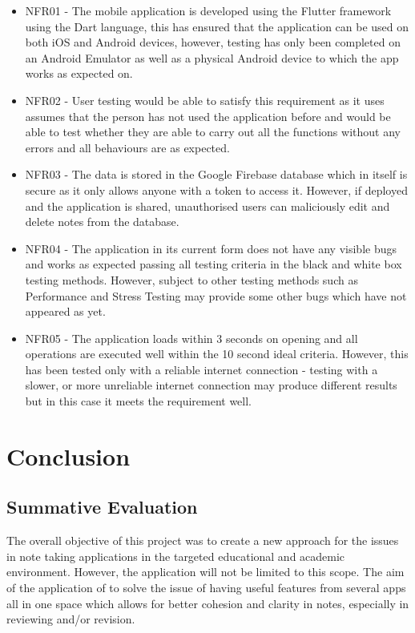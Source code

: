 \documentclass[oneside]{report}
\begin{document}
	\begin{itemize}
		\item NFR01 - The mobile application is developed using the Flutter framework using the Dart language, this has ensured that the application can be used on both iOS and Android devices, however, testing has only been completed on an Android Emulator as well as a physical Android device to which the app works as expected on.
		\item NFR02 - User testing would be able to satisfy this requirement as it uses assumes that the person has not used the application before and would be able to test whether they are able to carry out all the functions without any errors and all behaviours are as expected.
		\item NFR03 - The data is stored in the Google Firebase database which in itself is secure as it only allows anyone with a token to access it. However, if deployed and the application is shared, unauthorised users can maliciously edit and delete notes from the database.
		\item NFR04 - The application in its current form does not have any visible bugs and works as expected passing all testing criteria in the black and white box testing methods. However, subject to other testing methods such as Performance and Stress Testing may provide some other bugs which have not appeared as yet.
		\item NFR05 - The application loads within 3 seconds on opening and all operations are executed well within the 10 second ideal criteria. However, this has been tested only with a reliable internet connection - testing with a slower, or more unreliable internet connection may produce different results but in this case it meets the requirement well.
	\end{itemize}


\chapter{Conclusion}
	\section{Summative Evaluation}
		The overall objective of this project was to create a new approach for the issues in note taking applications in the targeted educational and academic environment. However, the application will not be limited to this scope. The aim of the application of to solve the issue of having useful features from several apps all in one space which allows for better cohesion and clarity in notes, especially in reviewing and/or revision. \\
\end{document}
